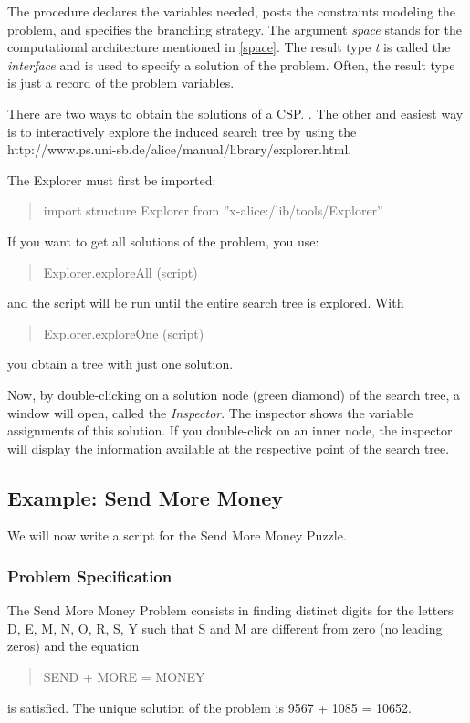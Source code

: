 \documentclass[a4paper,halfparskip]{scrartcl}
\begin{document}
The procedure declares the variables needed, 
posts the constraints modeling the problem, 
and specifies the branching strategy.
The argument \emph{space} stands for the 
computational architecture mentioned in 
\ref{space}.
The result type \emph{t} is called 
the \emph{interface} and is used to specify
a solution of the problem.
Often, the result type is just a record of the 
problem variables.

There are two ways to obtain the solutions of a 
CSP. . 
The other
and easiest way is to interactively explore the 
induced search tree by using the
\htmladdnormallink{\textcolor{blue}{Explorer}}
{http://www.ps.uni-sb.de/alice/manual/library/explorer.html}.

The Explorer  must first be imported:
\begin{quote}
import structure Explorer from ''x-alice:/lib/tools/Explorer''
\end{quote}
If you want to get all solutions of the problem, 
you use:
\begin{quote}
Explorer.exploreAll (script)
\end{quote}
and the script will be run until the entire 
search tree is explored.
With 
\begin{quote}
Explorer.exploreOne (script)
\end{quote}
you obtain a tree with just one solution.

Now, by double-clicking on a solution node 
(green diamond) of the search tree, a window
will open, called the \emph{Inspector}. The 
inspector shows the variable assignments of
this solution.
If you double-click on an inner node, the 
inspector will display the information available 
at the respective point of the search tree.

\subsection{Example: Send More Money}
We will now write a script for the Send More 
Money Puzzle.

\subsubsection{Problem Specification}
The Send More Money Problem consists in finding 
distinct digits for the letters 
D, E, M, N, O, R, S, Y such that S and M are 
different from zero (no leading zeros) 
and the equation
\begin{quote}
SEND + MORE = MONEY
\end{quote}
is satisfied. The unique solution of the problem 
is 9567 + 1085 = 10652.
\end{document}
